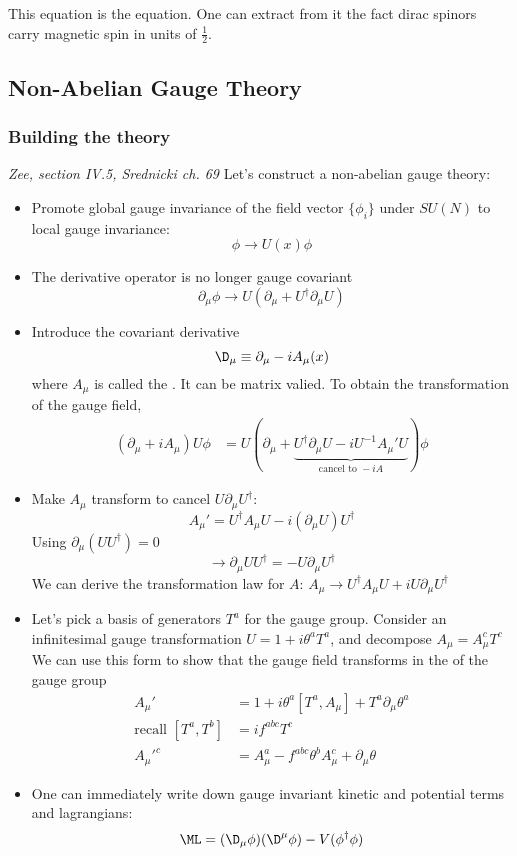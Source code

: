 \documentclass[11pt]{scrartcl}
\begin{document}
This equation is the  equation.  One can extract from it the fact dirac spinors carry magnetic  spin in units of $\frac12$.


\subsection{Non-Abelian Gauge Theory}
\subsubsection{Building the theory}
\emph{Zee, section IV.5, Srednicki ch. 69}
Let's construct a non-abelian gauge theory:
\begin{itemize}
	\item Promote global gauge invariance of the field vector $\{\phi_i \}$ under $SU(N)$ to local gauge invariance:
	\[\phi \rightarrow U(x) \phi \]
	\item The derivative operator is no longer gauge covariant
	\[ \partial_\mu \phi \rightarrow U( \partial_\mu  + U^\dagger \partial_\mu U) \]
	\item Introduce the covariant derivative
	\[ \D_\mu \equiv \partial_\mu - i A_\mu(x) \]
	where $A_\mu$ is called the .  It can be matrix valied.  To obtain the transformation of the gauge field,
	\begin{align}
		(\partial_\mu + i A_\mu) U \phi & = U( \partial_\mu + \underbrace{U^\dagger \partial_\mu U - i U^{-1} {A_\mu}' U}_{\text{cancel to } -i A}) \phi 
		\end{align}
	\item Make $A_\mu$ transform to cancel $U \partial_\mu U^\dagger$:
	\[A_\mu' = U^\dagger A_\mu U - i (\partial_\mu U) U^\dagger  \]
	Using $\partial_\mu (U U^\dagger) = 0$
	\[ \rightarrow
	\partial_\mu U U^\dagger = - U \partial_\mu U^\dagger\]
	We can derive the transformation law for $A$:
	$A_\mu \rightarrow U^{\dagger} A_\mu U + i U \partial_\mu U^{\dagger}$
	\item Let's pick a  basis of generators $T^a$ for the gauge group. Consider an infinitesimal gauge transformation $U = 1 + i \theta^a T^a$, and decompose $A_\mu =A_\mu^c T^c $ We can use this form to show that the gauge field transforms in the  of the gauge group
	\begin{align*}
		{A_\mu}' &= 1 + i \theta^a [T^a, A_\mu] + T^a \partial_\mu \theta^a \\
		\text{recall } [T^a, T^b] &= i f^{abc} T^c \\
		{A_\mu}'^c &= A_\mu^a - f^{abc} \theta^b A_\mu^c + \partial_\mu \theta
		\end{align*}
	\item One can immediately write down gauge invariant kinetic and potential terms and lagrangians:
	\[ \ML = (\D_\mu \phi) (\D^\mu \phi) - V(\phi^\dagger \phi) \]
	\end{itemize}
\end{document}
